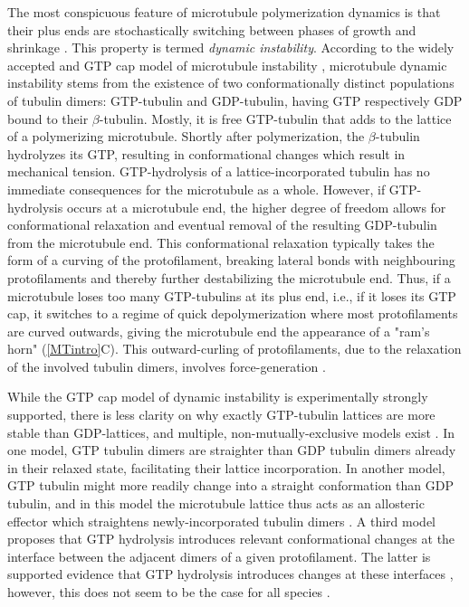 The most conspicuous feature of microtubule polymerization dynamics is that their plus ends are stochastically switching between phases of growth and shrinkage \parencite{Janosi2002}. This property is termed \textit{dynamic instability}. According to the widely accepted and GTP cap model of microtubule instability , microtubule dynamic instability stems from the existence of two conformationally distinct populations of tubulin dimers: GTP-tubulin and GDP-tubulin, having GTP respectively GDP bound to their $\beta$-tubulin. Mostly, it is free GTP-tubulin that adds to the lattice of a polymerizing microtubule. Shortly after polymerization, the $\beta$-tubulin hydrolyzes its GTP, resulting in conformational changes which result in mechanical tension. GTP-hydrolysis of a lattice-incorporated tubulin has no immediate consequences for the microtubule as a whole. However, if GTP-hydrolysis occurs at a microtubule end, the higher degree of freedom allows for conformational relaxation and eventual removal of the resulting GDP-tubulin from the microtubule end. This conformational relaxation typically takes the form of a curving of the protofilament, breaking lateral bonds with neighbouring protofilaments and thereby further destabilizing the microtubule end. Thus, if a microtubule loses too many GTP-tubulins at its plus end, i.e., if it loses its GTP cap, it switches to a regime of quick depolymerization where most protofilaments are curved outwards, giving the microtubule end the appearance of a "ram's horn" (\autoref{MTintro}C). This outward-curling of protofilaments, due to the relaxation of the involved tubulin dimers, involves force-generation .\par 

While the GTP cap model of dynamic instability is experimentally strongly supported, there is less clarity on why exactly GTP-tubulin lattices are more stable than GDP-lattices, and multiple, non-mutually-exclusive models exist . In one model, GTP tubulin dimers are straighter than GDP tubulin dimers already in their relaxed state, facilitating their lattice incorporation. In another model, GTP tubulin might more readily change into a straight conformation than GDP tubulin, and in this model the microtubule lattice thus acts as an allosteric effector which straightens newly-incorporated tubulin dimers . A third model proposes that GTP hydrolysis introduces relevant conformational changes at the interface between the adjacent dimers of a given protofilament. The latter is supported evidence that GTP hydrolysis introduces changes at these interfaces , however, this does not seem to be the case for all species \cite{Cross2019}.\par

